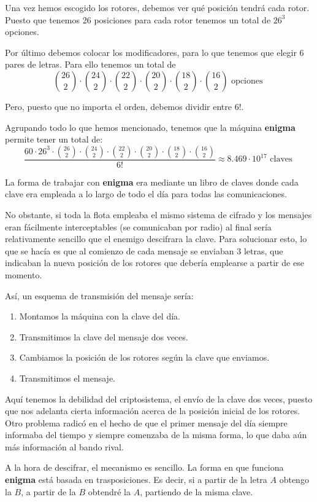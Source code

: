 Una vez hemos escogido los rotores, debemos ver qué posición tendrá cada rotor. Puesto que tenemos 26 posiciones para cada rotor tenemos un total de $26^3$ opciones.

Por último debemos colocar los modificadores, para lo que tenemos que elegir 6 pares de letras. Para ello tenemos un total de
\[{26 \choose 2} \cdot {24\choose 2}\cdot {22\choose 2}\cdot {20\choose 2}\cdot {18\choose 2}\cdot {16\choose 2} \text{ opciones }\]

Pero, puesto que no importa el orden, debemos dividir entre $6!$.

Agrupando todo lo que hemos mencionado, tenemos que la máquina \textbf{enigma} permite tener un total de:
\[\frac{60\cdot 26^3 \cdot {26 \choose 2} \cdot {24\choose 2}\cdot {22\choose 2}\cdot {20\choose 2}\cdot {18\choose 2}\cdot {16\choose 2}}{6!}\approx 8.469 \cdot 10^{17}  \text{ claves }\]

La forma de trabajar con \textbf{enigma} era mediante un libro de claves donde cada clave era empleada a lo largo de todo el día para todas las comunicaciones.

No obstante, si toda la flota empleaba el mismo sistema de cifrado y los mensajes eran fácilmente interceptables (se comunicaban por radio) al final sería relativamente sencillo que el enemigo descifrara la clave. Para solucionar esto, lo que se hacía es que al comienzo de cada mensaje se enviaban 3 letras, que indicaban la nueva posición de los rotores que debería emplearse a partir de ese momento.

Así, un esquema de transmisión del mensaje sería:
\begin{enumerate}
\item Montamos la máquina con la clave del día.
\item Transmitimos la clave del mensaje dos veces.
\item Cambiamos la posición de los rotores según la clave que enviamos.
\item Transmitimos el mensaje.
\end{enumerate}

Aquí tenemos la debilidad del criptosistema, el envío de la clave dos veces, puesto que nos adelanta cierta información acerca de la posición inicial de los rotores. Otro problema radicó en el hecho de que el primer mensaje del día siempre informaba del tiempo y siempre comenzaba de la misma forma, lo que daba aún más información al bando rival.

A la hora de descifrar, el mecanismo es sencillo. La forma en que funciona \textbf{enigma} está basada en trasposiciones. Es decir, si a partir de la letra $A$ obtengo la $B$, a partir de la $B$ obtendré la $A$, partiendo de la misma clave.

